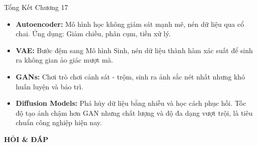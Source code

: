\documentclass[aspectratio=169, 12pt]{beamer}
\begin{document}
\begin{frame}{Tổng Kết Chương 17}
    \begin{itemize}
        \item \textbf{Autoencoder:} Mô hình học không giám sát mạnh mẽ, nén dữ liệu qua cổ chai. Ứng dụng: Giảm chiều, phân cụm, tiền xử lý.
        \item \textbf{VAE:} Bước đệm sang Mô hình Sinh, nén dữ liệu thành hàm xác suất để sinh ra không gian ảo giác mượt mà.
        \item \textbf{GANs:} Chơi trò chơi cảnh sát - trộm, sinh ra ảnh sắc nét nhất nhưng khó huấn luyện và bảo trì.
        \item \textbf{Diffusion Models:} Phá hủy dữ liệu bằng nhiễu và học cách phục hồi. Tốc độ tạo ảnh chậm hơn GAN nhưng chất lượng và độ đa dạng vượt trội, là tiêu chuẩn công nghiệp hiện nay.
    \end{itemize}
\end{frame}

\begin{frame}
    \centering
    \Huge \textbf{HỎI \& ĐÁP}
\end{frame}
\end{document}
